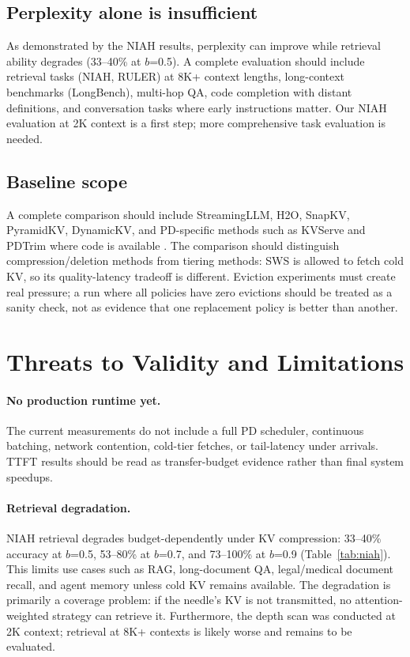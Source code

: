 \documentclass[11pt]{article}
\newcommand{\method}{SWS}
\newcommand{\pct}{\%}
\theoremstyle{definition}
\theoremstyle{plain}
\begin{document}
\subsection{Perplexity alone is insufficient}
As demonstrated by the NIAH results, perplexity can improve while retrieval ability degrades (33--40\pct{} at $b$=0.5).  A complete evaluation should include retrieval tasks (NIAH, RULER) at 8K+ context lengths, long-context benchmarks (LongBench), multi-hop QA, code completion with distant definitions, and conversation tasks where early instructions matter.  Our NIAH evaluation at 2K context is a first step; more comprehensive task evaluation is needed.

\subsection{Baseline scope}
A complete comparison should include StreamingLLM, H2O, SnapKV, PyramidKV, DynamicKV, and PD-specific methods such as KVServe and PDTrim where code is available \citep{streamingllm,h2o,snapkv,pyramidkv,dynamickv,kvserve,pdtrim}.  The comparison should distinguish compression/deletion methods from tiering methods: \method{} is allowed to fetch cold KV, so its quality-latency tradeoff is different.  Eviction experiments must create real pressure; a run where all policies have zero evictions should be treated as a sanity check, not as evidence that one replacement policy is better than another.

\section{Threats to Validity and Limitations}
\label{sec:limitations}

\paragraph{No production runtime yet.}
The current measurements do not include a full PD scheduler, continuous batching, network contention, cold-tier fetches, or tail-latency under arrivals.  TTFT results should be read as transfer-budget evidence rather than final system speedups.

\paragraph{Retrieval degradation.}
NIAH retrieval degrades budget-dependently under KV compression: 33--40\pct{} accuracy at $b$=0.5, 53--80\pct{} at $b$=0.7, and 73--100\pct{} at $b$=0.9 (Table~\ref{tab:niah}).  This limits use cases such as RAG, long-document QA, legal/medical document recall, and agent memory unless cold KV remains available.  The degradation is primarily a coverage problem: if the needle's KV is not transmitted, no attention-weighted strategy can retrieve it.  Furthermore, the depth scan was conducted at 2K context; retrieval at 8K+ contexts is likely worse and remains to be evaluated.
\end{document}
